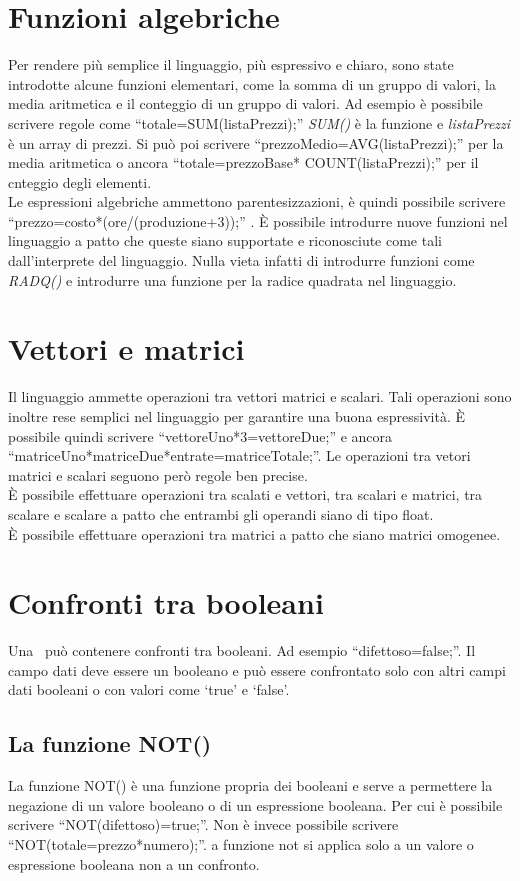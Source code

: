 \section{Funzioni algebriche}
Per rendere pi\`u semplice il linguaggio, pi\`u espressivo e chiaro, sono state introdotte alcune funzioni elementari, come la somma di un gruppo di valori, la media aritmetica e il conteggio di un gruppo di valori. Ad esempio \`e possibile scrivere regole come ``totale=SUM(listaPrezzi);'' \textit{SUM()} \`e la funzione e \textit{listaPrezzi} \`e un array di prezzi. Si pu\`o poi scrivere ``prezzoMedio=AVG(listaPrezzi);'' per la media aritmetica   o ancora ``totale=prezzoBase* COUNT(listaPrezzi);'' per il cnteggio degli elementi.\\
Le espressioni algebriche ammettono parentesizzazioni, \`e quindi possibile scrivere ``prezzo=costo*(ore/(produzione+3));'' .
\`E possibile introdurre nuove funzioni nel linguaggio a patto che queste siano supportate e riconosciute come tali dall'interprete del linguaggio. Nulla vieta infatti di introdurre funzioni come \textit{RADQ()} e introdurre una funzione per la radice quadrata nel linguaggio.

\section{Vettori e matrici}
Il linguaggio ammette operazioni tra vettori matrici e scalari. Tali operazioni sono inoltre rese semplici nel linguaggio per garantire una buona espressivit\`a. \`E possibile quindi scrivere ``vettoreUno*3=vettoreDue;'' e ancora ``matriceUno*matriceDue*entrate=matriceTotale;''. Le operazioni tra vetori matrici e scalari seguono per\`o regole ben precise.\\
\`E possibile effettuare operazioni tra scalati e vettori, tra scalari e matrici, tra scalare e scalare a patto che entrambi gli operandi siano di tipo float.\\
\`E possibile effettuare operazioni tra matrici a patto che siano matrici omogenee.

\section{Confronti tra booleani}
Una \br\ pu\`o contenere confronti tra booleani. Ad esempio ``difettoso=false;''. Il campo dati deve essere un booleano e pu\`o essere confrontato solo con altri campi dati booleani o con valori come `true' e `false'. 
\subsection{La funzione NOT()}
La funzione NOT() \`e una funzione propria dei booleani e serve a permettere la negazione di un valore booleano o di un espressione booleana. Per cui \`e possibile scrivere ``NOT(difettoso)=true;''. Non \`e invece possibile scrivere ``NOT(totale=prezzo*numero);''. a funzione not si applica solo a un valore o espressione booleana non a un confronto.
